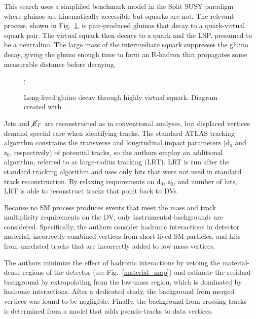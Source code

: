 \documentclass[12pt]{article}
\begin{document}
        This search uses a simplified benchmark model in the Split SUSY paradigm where gluinos are kinematically accessible but squarks are not. The relevant process, shown in Fig.~\ref{displaced_process}, is pair-produced gluinos that decay to a quark-virtual squark pair. The virtual squark then decays to a quark and the LSP, presumed to be a neutralino. The large mass of the intermediate squark suppresses the gluino decay, giving the gluino enough time to form an R-hadron that propagates some measurable distance before decaying. 

        \noindent \begin{figure}[htbp] \begin{center}
        ;
        \caption{Long-lived gluino decay through highly virtual squark. Diagram created with~\cite{tikz}.}
        \label{displaced_process}
        \end{center} \end{figure}

        Jets and $\cancel{\it{E}}_{T}$ are reconstructed as in conventional analyses, but displaced vertices demand special care when identifying tracks. The standard ATLAS tracking algorithm constrains the transverse and longitudinal impact parameters ($\mathrm{d}_0$ and $\mathrm{z}_0$, respectively) of potential tracks, so the authors employ an additional algorithm, referred to as large-radius tracking (LRT). LRT is run after the standard tracking algorithm and uses only hits that were not used in standard track reconstruction. By relaxing requirements on $\mathrm{d}_0$, $\mathrm{z}_0$, and number of hits, LRT is able to reconstruct tracks that point back to DVs.
        
        Because no SM process produces events that meet the mass and track multiplicity requirements on the DV, only instrumental backgrounds are considered. Specifically, the authors consider hadronic interactions in detector material, incorrectly combined vertices from short-lived SM particles, and hits from unrelated tracks that are incorrectly added to low-mass vertices.

        The authors minimize the effect of hadronic interactions by vetoing the material-dense regions of the detector (see Fig.~\ref{material_map}) and estimate the residual background by extrapolating from the low-mass region, which is dominated by hadronic interactions. After a dedicated study, the background from merged vertices was found to be negligible. Finally, the background from crossing tracks is determined from a model that adds pseudo-tracks to data vertices.
\end{document}
